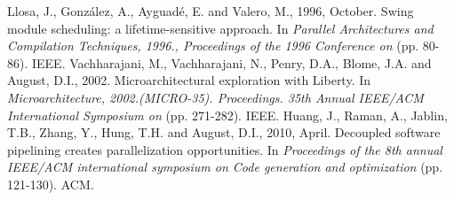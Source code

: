 \documentclass[letterpaper, 10 pt, conference]{ieeeconf}  %
\begin{document}
\begin{thebibliography}{3}
 Llosa, J., González, A., Ayguadé, E. and Valero, M., 1996, October. Swing module scheduling: a lifetime-sensitive approach. In \textit{Parallel Architectures and Compilation Techniques, 1996., Proceedings of the 1996 Conference on} (pp. 80-86). IEEE.
 Vachharajani, M., Vachharajani, N., Penry, D.A., Blome, J.A. and August, D.I., 2002. Microarchitectural exploration with Liberty. In \textit{Microarchitecture, 2002.(MICRO-35). Proceedings. 35th Annual IEEE/ACM International Symposium on} (pp. 271-282). IEEE.
 Huang, J., Raman, A., Jablin, T.B., Zhang, Y., Hung, T.H. and August, D.I., 2010, April. Decoupled software pipelining creates parallelization opportunities. In \textit{Proceedings of the 8th annual IEEE/ACM international symposium on Code generation and optimization} (pp. 121-130). ACM.
\end{thebibliography}
\end{document}
